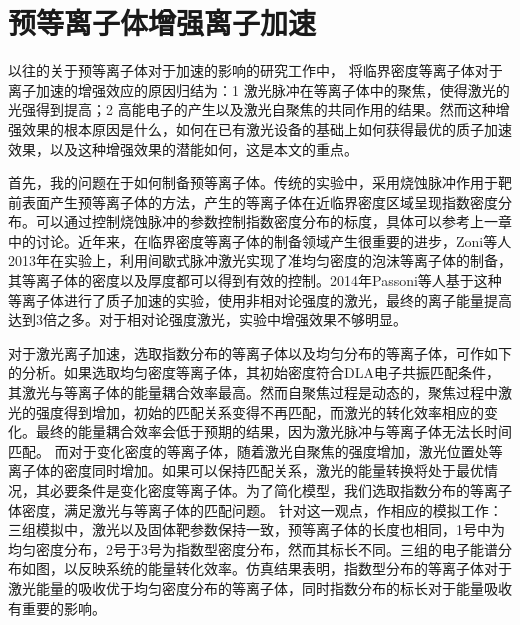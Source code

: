 \section{预等离子体增强离子加速}



以往的关于预等离子体对于加速的影响的研究工作中， 将临界密度等离子体对于离子加速的增强效应的原因归结为：1 激光脉冲在等离子体中的聚焦，使得激光的光强得到提高；2 高能电子的产生以及激光自聚焦的共同作用的结果。然而这种增强效果的根本原因是什么，如何在已有激光设备的基础上如何获得最优的质子加速效果，以及这种增强效果的潜能如何，这是本文的重点。


首先，我的问题在于如何制备预等离子体。传统的实验中，采用烧蚀脉冲作用于靶前表面产生预等离子体的方法，产生的等离子体在近临界密度区域呈现指数密度分布。可以通过控制烧蚀脉冲的参数控制指数密度分布的标度，具体可以参考上一章中的讨论。近年来，在临界密度等离子体的制备领域产生很重要的进步，Zoni等人2013年在实验上，利用间歇式脉冲激光实现了准均匀密度的泡沫等离子体的制备，其等离子体的密度以及厚度都可以得到有效的控制。2014年Passoni等人基于这种等离子体进行了质子加速的实验，使用非相对论强度的激光，最终的离子能量提高达到3倍之多。对于相对论强度激光，实验中增强效果不够明显。

对于激光离子加速，选取指数分布的等离子体以及均匀分布的等离子体，可作如下的分析。如果选取均匀密度等离子体，其初始密度符合DLA电子共振匹配条件，其激光与等离子体的能量耦合效率最高。然而自聚焦过程是动态的，聚焦过程中激光的强度得到增加，初始的匹配关系变得不再匹配，而激光的转化效率相应的变化。最终的能量耦合效率会低于预期的结果，因为激光脉冲与等离子体无法长时间匹配。 而对于变化密度的等离子体，随着激光自聚焦的强度增加，激光位置处等离子体的密度同时增加。如果可以保持匹配关系，激光的能量转换将处于最优情况，其必要条件是变化密度等离子体。为了简化模型，我们选取指数分布的等离子体密度，满足激光与等离子体的匹配问题。 针对这一观点，作相应的模拟工作：三组模拟中，激光以及固体靶参数保持一致，预等离子体的长度也相同，1号中为均匀密度分布，2号于3号为指数型密度分布，然而其标长不同。三组的电子能谱分布如图，以反映系统的能量转化效率。仿真结果表明，指数型分布的等离子体对于激光能量的吸收优于均匀密度分布的等离子体，同时指数分布的标长对于能量吸收有重要的影响。

